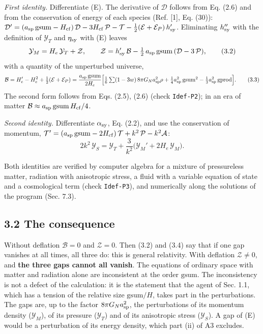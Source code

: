 \documentclass[
  10pt,
]{article}
\begin{document}
\emph{First identity.} Differentiate (E). The derivative of
\(\mathcal D\) follows from Eq. (2.6) and from the conservation of
energy of each species (Ref. {[}1{]}, Eq. (30)):
\(\mathcal D'=(a_{\rm sp}\,\mathrm{gsum}-H_{\rm cf})\,\mathcal D-3H_{\rm cf}\,\mathcal P-\mathcal T-\tfrac12(\mathcal E+\mathcal E_P)\,h_{\rm sy}'\).
Eliminating \(h_{\rm sy}''\) with the definition of \(\mathcal Y_T\) and
\(\eta_{\rm sy}\) with (E) leaves
\[\mathcal Y_M=H_e\,\mathcal Y_T+\mathcal Z,\qquad \mathcal Z=h_{\rm sy}'\,\mathcal B-\tfrac12\,a_{\rm sp}\,\mathrm{gsum}\,(\mathcal D-3\,\mathcal P),\tag{3.2}\]
with a quantity of the unperturbed universe,
\[\mathcal B=H_e'-H_e^2+\tfrac12(\mathcal E+\mathcal E_P)
=\frac{a_{\rm sp}\,\mathrm{gsum}}{2H_e}\Big[\tfrac16\textstyle\sum(1-3w)\,8\pi G_Na_{\rm sp}^2\rho+\tfrac14a_{\rm sp}^2\,\mathrm{gsum}^2-\tfrac13a_{\rm sp}^2\,\mathrm{gprod}\Big] .\tag{3.3}\]
The second form follows from Eqs. (2.5), (2.6) (check \texttt{Idef-P2});
in an era of matter
\(\mathcal B\approx a_{\rm sp}\,\mathrm{gsum}\,H_{\rm cf}/4\).

\emph{Second identity.} Differentiate \(\alpha_{\rm sy}\), Eq. (2.2),
and use the conservation of momentum,
\(\mathcal T'=(a_{\rm sp}\,\mathrm{gsum}-2H_{\rm cf})\,\mathcal T+k^2\,\mathcal P-k^2\mathcal A\):
\[2k^2\,\mathcal Y_S=\mathcal Y_T+\frac{3}{k^2}\big(\mathcal Y_M'+2H_e\,\mathcal Y_M\big).\tag{3.4}\]

Both identities are verified by computer algebra for a mixture of
pressureless matter, radiation with anisotropic stress, a fluid with a
variable equation of state and a cosmological term (check
\texttt{Idef-P3}), and numerically along the solutions of the program
(Sec. 7.3).

\hypertarget{the-consequence}{%
\subsection{3.2 The consequence}\label{the-consequence}}

Without deflation \(\mathcal B=0\) and \(\mathcal Z=0\). Then (3.2) and
(3.4) say that if one gap vanishes at all times, all three do: this is
general relativity. With deflation \(\mathcal Z\ne0\), and \textbf{the
three gaps cannot all vanish}. The equations of ordinary space with
matter and radiation alone are inconsistent at the order
\(\mathrm{gsum}\). The inconsistency is not a defect of the calculation:
it is the statement that the agent of Sec. 1.1, which has a tension of
the relative size \(\mathrm{gsum}/H\), takes part in the perturbations.
The gaps are, up to the factor \(8\pi G_Na_{\rm sp}^2\), the
perturbations of its momentum density (\(\mathcal Y_M\)), of its
pressure (\(\mathcal Y_T\)) and of its anisotropic stress
(\(\mathcal Y_S\)). A gap of (E) would be a perturbation of its energy
density, which part (ii) of A3 excludes.
\end{document}
